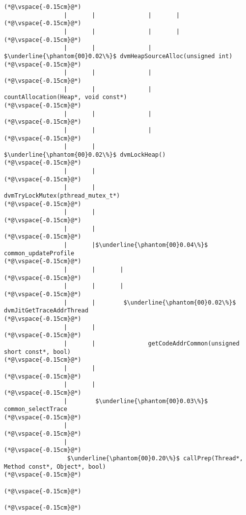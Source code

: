 \begin{lstlisting}[caption=NewDirectByteBuffer, label=profile:C2JNewDirectBuffer-512, numberbychapter=true, frame=lines, float, floatplacement=t]
(*@\vspace{-0.15cm}@*)
                 |       |               |       |
(*@\vspace{-0.15cm}@*)
                 |       |               |       |
(*@\vspace{-0.15cm}@*)
                 |       |               |        $\underline{\phantom{00}0.02\%}$ dvmHeapSourceAlloc(unsigned int)
(*@\vspace{-0.15cm}@*)
                 |       |               |
(*@\vspace{-0.15cm}@*)
                 |       |               |               countAllocation(Heap*, void const*)
(*@\vspace{-0.15cm}@*)
                 |       |               |
(*@\vspace{-0.15cm}@*)
                 |       |               |
(*@\vspace{-0.15cm}@*)
                 |       |                $\underline{\phantom{00}0.02\%}$ dvmLockHeap()
(*@\vspace{-0.15cm}@*)
                 |       |   
(*@\vspace{-0.15cm}@*)
                 |       |                       dvmTryLockMutex(pthread_mutex_t*)
(*@\vspace{-0.15cm}@*)
                 |       |
(*@\vspace{-0.15cm}@*)
                 |       |
(*@\vspace{-0.15cm}@*)
                 |       |$\underline{\phantom{00}0.04\%}$ common_updateProfile
(*@\vspace{-0.15cm}@*)
                 |       |       |
(*@\vspace{-0.15cm}@*)
                 |       |       |
(*@\vspace{-0.15cm}@*)
                 |       |        $\underline{\phantom{00}0.02\%}$ dvmJitGetTraceAddrThread
(*@\vspace{-0.15cm}@*)
                 |       |  
(*@\vspace{-0.15cm}@*)
                 |       |               getCodeAddrCommon(unsigned short const*, bool)
(*@\vspace{-0.15cm}@*)
                 |       |
(*@\vspace{-0.15cm}@*)
                 |       |
(*@\vspace{-0.15cm}@*)
                 |        $\underline{\phantom{00}0.03\%}$ common_selectTrace
(*@\vspace{-0.15cm}@*)
                 |
(*@\vspace{-0.15cm}@*)
                 |
(*@\vspace{-0.15cm}@*)
                  $\underline{\phantom{00}0.20\%}$ callPrep(Thread*, Method const*, Object*, bool)
(*@\vspace{-0.15cm}@*)
          
(*@\vspace{-0.15cm}@*)
          
(*@\vspace{-0.15cm}@*)

\end{lstlisting}

